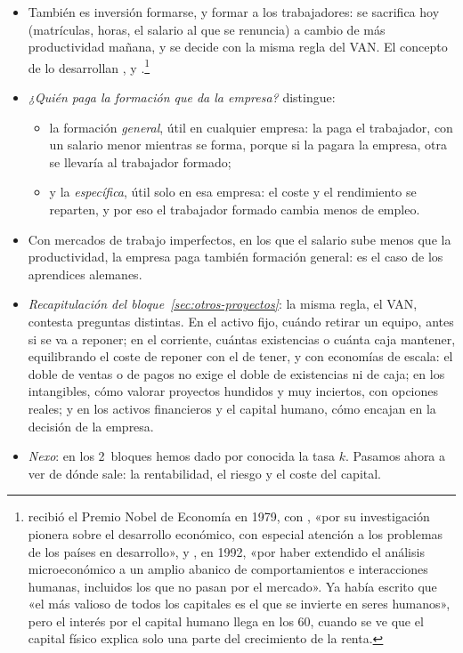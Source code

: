 \documentclass[11pt]{article}
\begin{document}
\begin{itemize}
\item También es inversión formarse, y formar a los trabajadores: se sacrifica hoy (matrículas, horas, el salario al que se renuncia) a cambio de más productividad mañana, y se decide con la misma regla del VAN. El concepto de  lo desarrollan \textcite{Schultz1961Investment}, \textcite{Becker1964Human} y \textcite{Mincer1974Schooling}  .\footnote{ recibió el Premio Nobel de Economía en 1979, con , «por su investigación pionera sobre el desarrollo económico, con especial atención a los problemas de los países en desarrollo»\nocite{NobelPrize1979}, y , en 1992, «por haber extendido el análisis microeconómico a un amplio abanico de comportamientos e interacciones humanas, incluidos los que no pasan por el mercado»\nocite{Nobel1992Becker}. Ya \textcite{Marshall1890Principles} había escrito que «el más valioso de todos los capitales es el que se invierte en seres humanos», pero el interés por el capital humano llega en los 60, cuando se ve que el capital físico explica solo una parte del crecimiento de la renta.}
\item \emph{¿Quién paga la formación que da la empresa?} \textcite{Becker1964Human} distingue:
  \begin{itemize}
  \item la formación \emph{general}, útil en cualquier empresa: la paga el trabajador, con un salario menor mientras se forma, porque si la pagara la empresa, otra se llevaría al trabajador formado;
  \item y la \emph{específica}, útil solo en esa empresa: el coste y el rendimiento se reparten, y por eso el trabajador formado cambia menos de empleo.
  \end{itemize}
\item Con mercados de trabajo imperfectos, en los que el salario sube menos que la productividad, la empresa paga también formación general\nocite{AcemogluPischke1998Why,AcemogluPischke1999Beyond}: es el caso de los aprendices alemanes.
\item \emph{Recapitulación del bloque~\ref{sec:otros-proyectos}}: la misma regla, el VAN, contesta preguntas distintas. En el activo fijo, cuándo retirar un equipo, antes si se va a reponer; en el corriente, cuántas existencias o cuánta caja mantener, equilibrando el coste de reponer con el de tener, y con economías de escala: el doble de ventas o de pagos no exige el doble de existencias ni de caja; en los intangibles, cómo valorar proyectos hundidos y muy inciertos, con opciones reales; y en los activos financieros y el capital humano, cómo encajan en la decisión de la empresa.
\item \emph{Nexo}: en los 2~bloques hemos dado por conocida la tasa $k$. Pasamos ahora a ver de dónde sale: la rentabilidad, el riesgo y el coste del capital.
\end{itemize}
\end{document}
